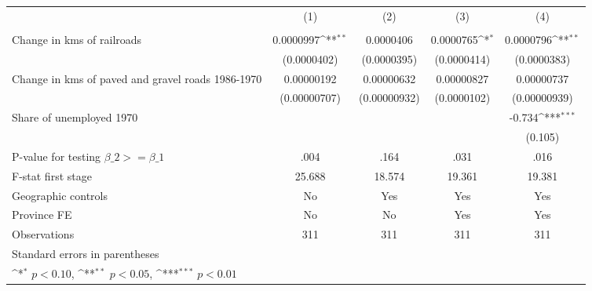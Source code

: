 {
\def\sym#1{\ifmmode^{#1}\else\(^{#1}\)\fi}
\begin{tabular}{l*{4}{c}}
\hline\hline
                &\multicolumn{1}{c}{(1)}&\multicolumn{1}{c}{(2)}&\multicolumn{1}{c}{(3)}&\multicolumn{1}{c}{(4)}\\
                &\multicolumn{1}{c}{}&\multicolumn{1}{c}{}&\multicolumn{1}{c}{}&\multicolumn{1}{c}{}\\
\hline
Change in kms of railroads&0.0000997\sym{**} &0.0000406         &0.0000765\sym{*}  &0.0000796\sym{**} \\
                &(0.0000402)         &(0.0000395)         &(0.0000414)         &(0.0000383)         \\
[1em]
Change in kms of paved and gravel roads 1986-1970&0.00000192         &0.00000632         &0.00000827         &0.00000737         \\
                &(0.00000707)         &(0.00000932)         &(0.0000102)         &(0.00000939)         \\
[1em]
Share of unemployed 1970&                  &                  &                  &   -0.734\sym{***}\\
                &                  &                  &                  &  (0.105)         \\
\hline
P-value for testing $\beta\_{2} >= \beta\_{1}$&     .004         &     .164         &     .031         &     .016         \\
F-stat first stage&   25.688         &   18.574         &   19.361         &   19.381         \\
Geographic controls&       No         &      Yes         &      Yes         &      Yes         \\
Province FE     &       No         &       No         &      Yes         &      Yes         \\
Observations    &      311         &      311         &      311         &      311         \\
\hline\hline
\multicolumn{5}{l}{\footnotesize Standard errors in parentheses}\\
\multicolumn{5}{l}{\footnotesize \sym{*} \(p<0.10\), \sym{**} \(p<0.05\), \sym{***} \(p<0.01\)}\\
\end{tabular}
}
